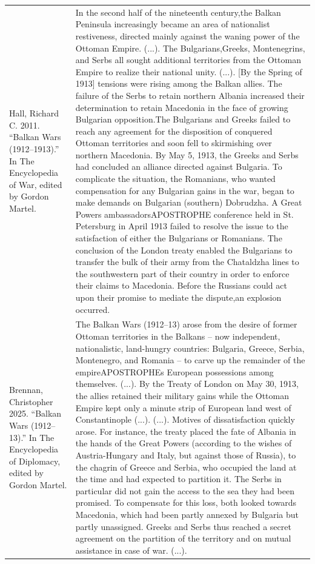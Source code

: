 {\begin{longtable}{p{}p{}}
\\
Hall, Richard C. 2011. “Balkan Wars (1912–1913).” In The Encyclopedia of War, edited by Gordon Martel. & In the second half of the nineteenth century,the Balkan Peninsula increasingly became an area of nationalist restiveness, directed mainly against the waning power of the Ottoman Empire. (...). The Bulgarians,Greeks, Montenegrins, and Serbs all sought additional territories from the Ottoman Empire to realize their national unity. (...).
[By the Spring of 1913] tensions were rising among the Balkan allies. The failure of the Serbs to retain northern Albania increased their determination to retain Macedonia in the face of growing Bulgarian opposition.The Bulgarians and Greeks failed to reach any agreement for the disposition of conquered Ottoman territories and soon fell to skirmishing over northern Macedonia. By May 5, 1913, the Greeks and Serbs had concluded an alliance directed against Bulgaria. To complicate the situation, the Romanians, who wanted compensation for any Bulgarian gains in the war, began to make demands on Bulgarian (southern) Dobrudzha. A Great Powers ambassadorsAPOSTROPHE conference held in St. Petersburg in April 1913 failed to resolve the issue to the satisfaction of either the Bulgarians or Romanians. The conclusion of the London treaty enabled the Bulgarians to transfer the bulk of their army from the Chataldzha lines to the southwestern part of their country in order to enforce their claims to Macedonia. Before the Russians could act upon their promise to mediate the dispute,an explosion occurred.
\\
Brennan, Christopher 2025. “Balkan Wars (1912–13).” In The Encyclopedia of Diplomacy, edited by Gordon Martel. & The Balkan Wars (1912–13) arose from the desire of former Ottoman territories in the Balkans – now independent, nationalistic, land-hungry countries: Bulgaria, Greece, Serbia, Montenegro, and Romania – to carve up the remainder of the empireAPOSTROPHEs European possessions among themselves. (...).
By the Treaty of London on May 30, 1913, the allies retained their military gains while the Ottoman Empire kept only a minute strip of European land west of Constantinople (...). (...). Motives of dissatisfaction quickly arose. For instance, the treaty placed the fate of Albania in the hands of the Great Powers (according to the wishes of Austria-Hungary and Italy, but against those of Russia), to the chagrin of Greece and Serbia, who occupied the land at the time and had expected to partition it. The Serbs in particular did not gain the access to the sea they had been promised. To compensate for this loss, both looked towards Macedonia, which had been partly annexed by Bulgaria but partly unassigned. Greeks and Serbs thus reached a secret agreement on the partition of the territory and on mutual assistance in case of war. (...).

\end{longtable}}
